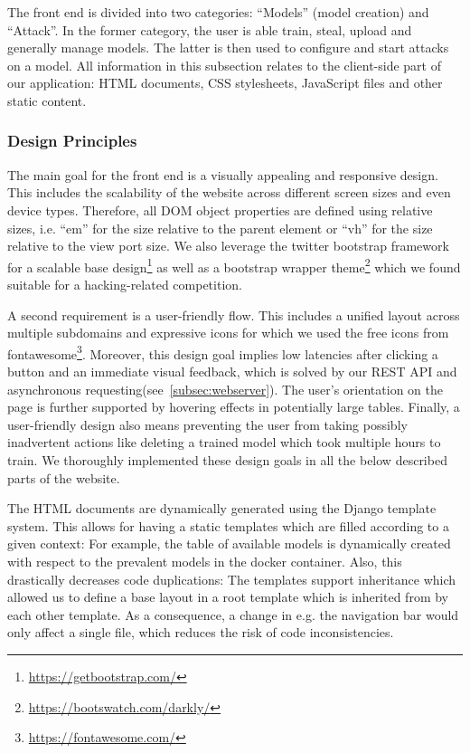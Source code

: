 The front end is divided into two categories: \enquote{Models} (model creation) and \enquote{Attack}.
In the former category, the user is able train, steal, upload and generally manage models. The latter is then used to configure and start attacks on a model.
All information in this subsection relates to the client-side part of our application: HTML documents, CSS stylesheets, JavaScript files and other static content.

\subsubsection{Design Principles}
The main goal for the front end is a visually appealing and responsive design.
This includes the scalability of the website across different screen sizes and even device types.
Therefore, all DOM object properties are defined using relative sizes, i.e. \enquote{em} for the size relative to the parent element or \enquote{vh} for the size relative to the view port size.
We also leverage the twitter bootstrap framework for a scalable base design\footnote{\url{https://getbootstrap.com/}} as well as a bootstrap wrapper theme\footnote{\url{https://bootswatch.com/darkly/}} which we found suitable for a hacking-related competition.

A second requirement is a user-friendly flow.
This includes a unified layout across multiple subdomains and expressive icons for which we used the free icons from fontawesome\footnote{\url{https://fontawesome.com/}}.
Moreover, this design goal implies low latencies after clicking a button and an immediate visual feedback, which is solved by our REST API and asynchronous requesting(see~\ref{subsec:webserver}).
The user's orientation on the page is further supported by hovering effects in potentially large tables.
Finally, a user-friendly design also means preventing the user from taking possibly inadvertent actions like deleting a trained model which took multiple hours to train.
We thoroughly implemented these design goals in all the below described parts of the website.

The HTML documents are dynamically generated using the Django template system.
This allows for having a static templates which are filled according to a given context: For example, the table of available models is dynamically created with respect to the prevalent models in the docker container.
Also, this drastically decreases code duplications: The templates support inheritance which allowed us to define a base layout in a root template which is inherited from by each other template.
As a consequence, a change in e.g. the navigation bar would only affect a single file, which reduces the risk of code inconsistencies.

